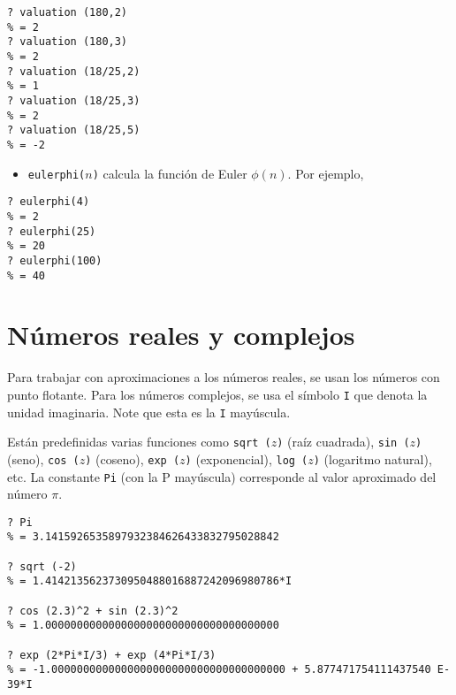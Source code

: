 \begin{framed}\footnotesize
\begin{verbatim}
? valuation (180,2)
% = 2
? valuation (180,3)
% = 2
? valuation (18/25,2)
% = 1
? valuation (18/25,3)
% = 2
? valuation (18/25,5)
% = -2
\end{verbatim}
\end{framed}

\begin{itemize}
\item \texttt{eulerphi($n$)} calcula la función de Euler $\phi (n)$. Por
  ejemplo,
\end{itemize}
\begin{framed}\footnotesize
\begin{verbatim}
? eulerphi(4)
% = 2
? eulerphi(25)
% = 20
? eulerphi(100)
% = 40
\end{verbatim}
\end{framed}


\section{Números reales y complejos}

Para trabajar con aproximaciones a los números reales, se usan los números con
punto flotante. Para los números complejos, se usa el símbolo \texttt{I} que
denota la unidad imaginaria. Note que esta es la \texttt{I} mayúscula.

Están predefinidas varias funciones como \texttt{sqrt\,($z$)} (raíz cuadrada),
\texttt{sin\,($z$)} (seno), \texttt{cos\,($z$)} (coseno), \texttt{exp\,($z$)}
(exponencial), \texttt{log\,($z$)} (logaritmo natural), etc. La constante
\texttt{Pi} (con la P mayúscula) corresponde al valor aproximado del número
$\pi$.

\begin{framed}\footnotesize
\begin{verbatim}
? Pi
% = 3.1415926535897932384626433832795028842

? sqrt (-2)
% = 1.4142135623730950488016887242096980786*I

? cos (2.3)^2 + sin (2.3)^2
% = 1.0000000000000000000000000000000000000

? exp (2*Pi*I/3) + exp (4*Pi*I/3)
% = -1.0000000000000000000000000000000000000 + 5.877471754111437540 E-39*I
\end{verbatim}
\end{framed}

